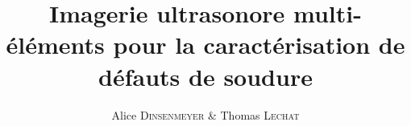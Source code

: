 \documentclass[twoside]{article}
\title{\vspace{-15mm}\fontsize{24pt}{10pt}\selectfont\textbf{Imagerie ultrasonore multi-éléments pour la caractérisation de défauts de soudure}} %
\author{
\large
{Alice \textsc{Dinsenmeyer} \& Thomas \textsc{Lechat}}\\[2mm] %
\vspace{-5mm}
}
\date{}
\begin{document}
\maketitle %

\thispagestyle{fancy} %


\begin{abstract}

\noindent 

\end{abstract}

\end{document}
